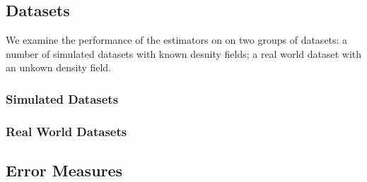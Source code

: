 

\subsection{Datasets}
\label{ss:3:datasets}
	We examine the performance of the estimators on on two groups of datasets: a number of simulated datasets with known desnity fields; a real world dataset with an unkown density field.

	\subsubsection*{Simulated Datasets}
					

	\subsubsection*{Real World Datasets}

\subsection{Error Measures}
\label{ss:3:errorMeasures}

